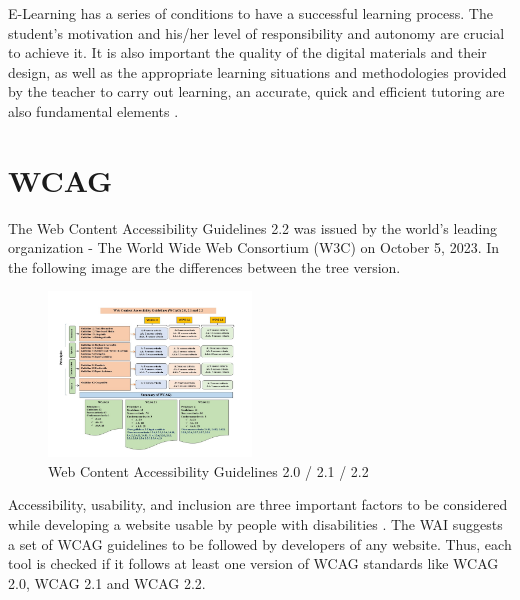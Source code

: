 \documentclass{IEEEtran}
\begin{document}
E-Learning has a series of conditions to have a successful learning process. The student's motivation and his/her level of responsibility and autonomy are crucial to achieve it. It is also important the quality of the digital materials and their design, as well as the appropriate learning situations and methodologies provided by the teacher to carry out learning, an accurate, quick and efficient tutoring are also fundamental elements \cite{Rahman2019}.

\section{WCAG}
The Web Content Accessibility Guidelines 2.2 \cite{W3C2023} was issued by the world's leading organization - The World Wide Web Consortium (W3C) on October 5, 2023.  In the following image are the differences between the tree version.

\begin{figure}[H]
    \includegraphics[width=0.48\textwidth]{images/figure2.png}
    \caption{ Web Content Accessibility Guidelines 2.0 / 2.1 / 2.2}
    \label{fig:figure2}
\end{figure}

Accessibility, usability, and inclusion are three important factors to be considered while developing a website usable by people with disabilities \cite{W3C2020}. The  WAI suggests a set of WCAG guidelines to be followed by developers of any website. Thus, each tool is checked if it follows at least one version of WCAG standards like WCAG 2.0, WCAG 2.1 and WCAG 2.2. 
\end{document}
